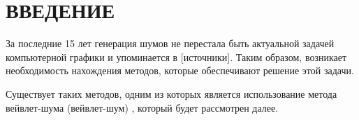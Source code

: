 \chapter*{ВВЕДЕНИЕ}

За последние 15 лет генерация %
шумов не перестала быть актуальной задачей компьютерной графики и упоминается в 
[источники]. Таким образом, возникает необходимость нахождения методов, которые обеспечивают решение этой задачи.

Существует таких методов, одним из которых является использование метода вейвлет-шума (вейвлет-шум) \cite{pixar,categories}, который будет рассмотрен далее.
